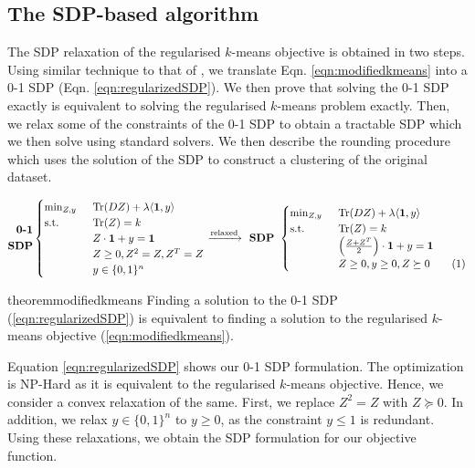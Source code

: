 \documentclass[12pt]{article}
\newcommand{\mb}{\mathbf}
\newcommand{\tr}{\text{Tr}}
\newcommand\numberthis{\addtocounter{equation}{1}\tag{\theequation}}
\begin{document}
 
\subsection{The SDP-based algorithm}
\label{subsection:sdpAlg}
The SDP relaxation of the regularised $k$-means objective is obtained in two steps. Using similar technique to that of \cite{peng2007approximating}, we translate Eqn. \ref{eqn:modifiedkmeans} into a 0-1 SDP (Eqn. \ref{eqn:regularizedSDP}). We then prove that solving the 0-1 SDP exactly is equivalent to solving the regularised $k$-means problem exactly. Then, we relax some of the constraints of the 0-1 SDP to obtain a tractable SDP which we then solve using standard solvers. We then describe the rounding procedure which uses the solution of the SDP to construct a clustering of the original dataset. 

\begin{equation*}
	\begin{split}
	\textbf{0-1}\\
	\textbf{SDP}
  \end{split}
	\begin{cases}
		\min_{Z, y} \enspace &\tr(DZ) + \lambda \langle \mb 1, y\rangle\\
		\text{s.t. } \enspace &\tr(Z) = k\\
		& Z\cdot \mb 1 + y = \mb 1\\	
		&Z\ge 0, Z^2 = Z, Z^T = Z \\
		& y \in \{0, 1\}^n
	\end{cases}
	\xrightarrow{\text{relaxed}} \textbf{ SDP } 
	\begin{cases}
		\min_{Z, y} \enspace &\tr(DZ) + \lambda \langle \mb 1, y\rangle\\
        \text{s.t. } \enspace &\tr(Z) = k\\
		& \Big(\frac{Z+Z^T}{2}\Big)\cdot \mb 1 + y = \mb 1\\		
		&Z \ge 0, y \ge 0, Z \succeq 0 \numberthis\label{eqn:regularizedSDP}
	\end{cases}
\end{equation*}

\begin{restatable}{theorem}{modifiedkmeans}
\label{thm:modifiedkmeans}
Finding a solution to the 0-1 SDP (\ref{eqn:regularizedSDP}) is equivalent to finding a solution to the regularised $k$-means objective (\ref{eqn:modifiedkmeans}). 
\end{restatable}

Equation \ref{eqn:regularizedSDP} shows our 0-1 SDP formulation. The optimization is NP-Hard as it is equivalent to the regularised $k$-means objective. Hence, we consider a convex relaxation of the same. First, we replace $Z^2 = Z$ with $Z \succeq 0$. In addition, we relax $y \in \{0, 1\}^n$ to $y \geq 0$, as the constraint $y\leq 1$ is redundant. Using these relaxations, we obtain the SDP formulation for our objective function.
\end{document}
